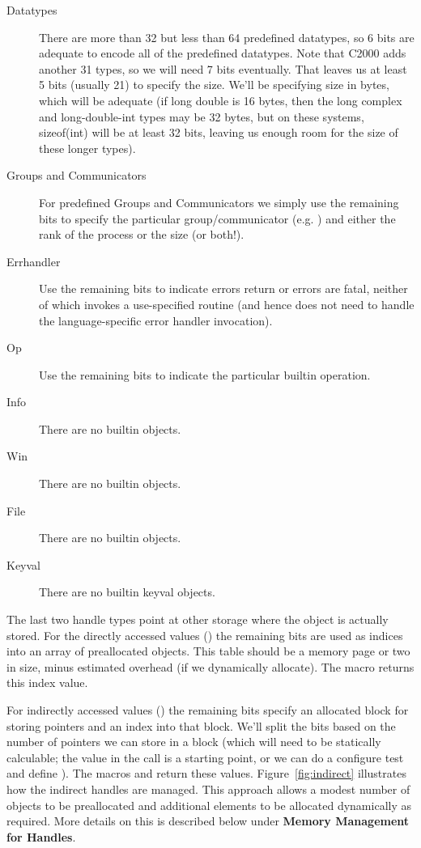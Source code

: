 \documentclass{article}
\begin{document}
\begin{description}
\item[Datatypes]
There are more than 32 but less than 64 predefined datatypes, so 6 bits are
adequate to encode all of the predefined datatypes.
Note that C2000 adds another 31 types, so we will need 7 bits eventually.
That leaves us at least 5 bits
(usually 21) to specify the size.  We'll be specifying size in bytes,
which will be adequate (if long double is 16 bytes, then the long complex and
long-double-int types may be 32 bytes, but on these systems, sizeof(int) will
be at least 32 bits, leaving us enough room for the size of these longer
types). 

\item[Groups and Communicators]
For predefined Groups and Communicators we simply use the remaining bits
to specify the particular group/communicator (e.g. ) and 
either the rank of the process or the size (or both!).  

\item[Errhandler] Use the remaining bits to indicate errors return or
errors are fatal, neither of which invokes a use-specified routine
(and hence does not need to handle the language-specific error handler
invocation).

\item[Op] Use the remaining bits to indicate the particular builtin operation.

\item[Info] There are no builtin  objects.
\item[Win] There are no builtin  objects.
\item[File] There are no builtin  objects.
\item[Keyval] There are no builtin keyval objects.
\end{description}

The last two handle types point at other storage where the object is
actually stored.
For the directly accessed values () the
remaining bits are used as indices into 
an array of preallocated objects.
This table should be 
a memory page or two in size, 
minus estimated  overhead (if we dynamically allocate).
The macro  returns this index value.

For indirectly accessed values () the
remaining bits specify an allocated block 
for storing pointers and an index into that block.  We'll split the bits
based on the number of pointers we can store in a block (which will need
to be statically calculable; the  value in the
 call is a starting point, or we can  do a configure test and
define ). 
The macros  and 
return these values.
Figure~\ref{fig:indirect} illustrates how the indirect handles are managed.
This approach allows a modest number of objects to be preallocated and
additional elements to be allocated dynamically as required.  More
details on this is described below under \textbf{Memory Management for
Handles}. 
\end{document}
